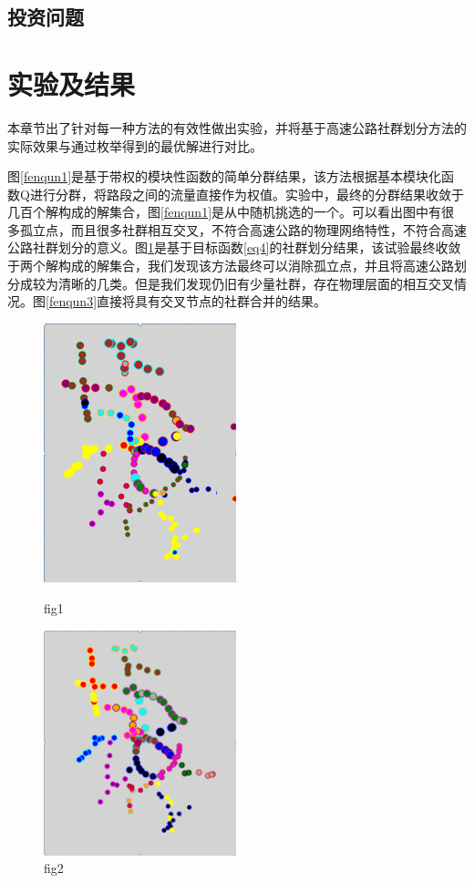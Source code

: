 		\subsection{投资问题}


	\section{实验及结果}
		本章节出了针对每一种方法的有效性做出实验，并将基于高速公路社群划分方法的实际效果与通过枚举得到的最优解进行对比。

		图\ref{fenqun1}是基于带权的模块性函数的简单分群结果，该方法根据基本模块化函数Q进行分群，将路段之间的流量直接作为权值。实验中，最终的分群结果收敛于几百个解构成的解集合，图\ref{fenqun1}是从中随机挑选的一个。可以看出图中有很多孤立点，而且很多社群相互交叉，不符合高速公路的物理网络特性，不符合高速公路社群划分的意义。图\ref{fenqun2}是基于目标函数\ref{eq4}的社群划分结果，该试验最终收敛于两个解构成的解集合，我们发现该方法最终可以消除孤立点，并且将高速公路划分成较为清晰的几类。但是我们发现仍旧有少量社群，存在物理层面的相互交叉情况。图\ref{fenqun3}直接将具有交叉节点的社群合并的结果。

				\begin{figure}
				\begin{minipage}{0.5\linewidth}
					\centering
					\includegraphics[width=2.2in]{picture/liuliangbianquan}
					\caption{fig1}
					\label{fenqun1}
				\end{minipage}%
				\begin{minipage}{0.5\linewidth}
					\centering
					\includegraphics[width=2.2in]{picture/xiaochuguli}
					\caption{fig2}
					\label{fenqun2}
				\end{minipage}
				\end{figure}

